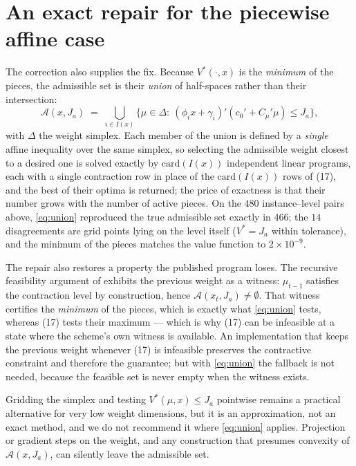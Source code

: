 \documentclass[review]{elsarticle}
\begin{document}
\section{An exact repair for the piecewise affine case}
The correction also supplies the fix. Because $V^\ast(\cdot,x)$ is the
\emph{minimum} of the pieces, the admissible set is their \emph{union} of
half-spaces rather than their intersection:
\begin{equation}
\mathcal{A}(x,J_a)\;=\;\bigcup_{i\in I(x)}
\bigl\{\mu\in\Delta:\ (\phi_i x+\gamma_i)'(c_0'+C_\mu'\mu)\le J_a\bigr\},
\label{eq:union}
\end{equation}
with $\Delta$ the weight simplex. Each member of the union is defined by a
\emph{single} affine inequality over the same simplex, so selecting the
admissible weight closest to a desired one is solved exactly by
$\mathrm{card}(I(x))$ independent linear programs, each with a single
contraction row in place of the $\mathrm{card}(I(x))$ rows of (17), and the
best of their optima is returned; the price of exactness is that their number
grows with the number of active pieces. On the $480$ instance--level pairs above,
\eqref{eq:union} reproduced the true admissible set exactly in $466$; the $14$ disagreements
are grid points lying on the level itself ($V^\ast=J_a$ within tolerance), and
the minimum of the pieces matches the value function to $2\times10^{-9}$.

The repair also restores a property the published program loses. The recursive
feasibility argument of \citep[Theorem~3]{bemporad2009} exhibits the previous
weight as a witness: $\mu_{t-1}$ satisfies the contraction level by
construction, hence $\mathcal{A}(x_t,J_a)\neq\emptyset$. That witness
certifies the \emph{minimum} of the pieces, which is exactly what
\eqref{eq:union} tests, whereas (17) tests their maximum --- which is why (17)
can be infeasible at a state where the scheme's own witness is available. An
implementation that keeps the previous weight whenever (17) is infeasible
preserves the contractive constraint and therefore the guarantee; but with
\eqref{eq:union} the fallback is not needed, because the feasible set is never
empty when the witness exists.

Gridding the simplex and testing $V^\ast(\mu,x)\le J_a$ pointwise remains a
practical alternative for very low weight dimensions, but it is an
approximation, not an exact method, and we do not recommend it where
\eqref{eq:union} applies. Projection or gradient steps on the weight, and any
construction that presumes convexity of $\mathcal{A}(x,J_a)$, can silently
leave the admissible set.
\end{document}
